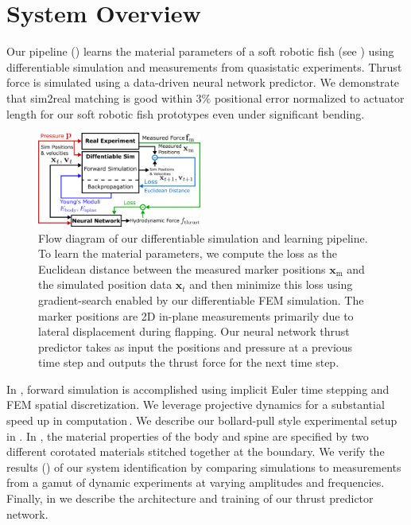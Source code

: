 \section{System Overview}
\label{system_overview}

Our pipeline () learns the material parameters of a soft robotic fish (see ) using differentiable simulation and measurements from quasistatic experiments. Thrust force is simulated using a data-driven neural network predictor. We demonstrate that sim2real matching is good within $3\%$ positional error normalized to actuator length for our soft robotic fish prototypes even under significant bending.

\begin{figure}[tb]
    \centering
    \includegraphics[width=0.48\textwidth]{figures/overview.png}
    \caption{Flow diagram of our differentiable simulation and learning pipeline. To learn the material parameters, we compute the loss as the Euclidean distance between the measured marker positions $\mathbf{x}_\textrm{m}$ and the simulated position data $\mathbf{x}_t$ and then minimize this loss using gradient-search enabled by our differentiable FEM simulation. The marker positions are 2D in-plane measurements primarily due to lateral displacement during flapping. Our neural network thrust predictor takes as input the positions and pressure at a previous time step and outputs the thrust force for the next time step.}
    \label{fig:overview}
\end{figure}

In , forward simulation is accomplished using implicit Euler time stepping and FEM spatial discretization. We leverage projective dynamics for a substantial speed up in computation\,\cite{du2021diffpd}.
We describe our bollard-pull style experimental setup in .
In , the material properties of the body and spine are specified by two different corotated materials stitched together at the boundary.
We verify the results () of our system identification by comparing simulations to measurements from a gamut of dynamic experiments at varying amplitudes and frequencies. Finally, in  we describe the architecture and training of our thrust predictor network.
